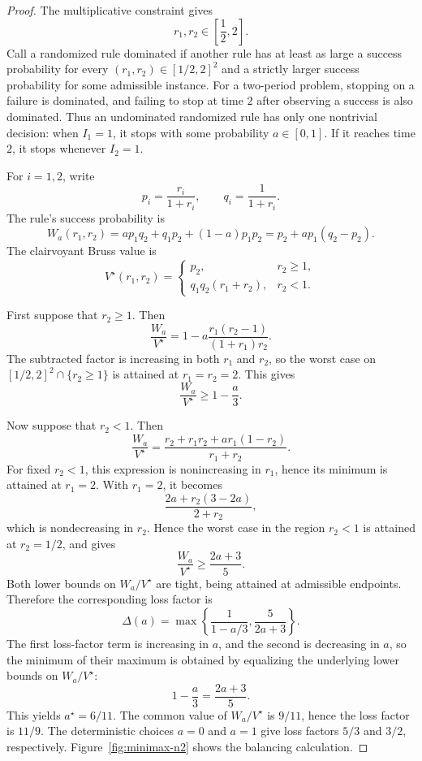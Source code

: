 \documentclass[11pt,a4paper]{article}
\begin{document}
\begin{proof}
The multiplicative constraint gives
\[
  r_1,r_2\in\left[\frac12,2\right].
\]
Call a randomized rule dominated if another rule has at least as large a success
probability for every \((r_1,r_2)\in[1/2,2]^2\) and a strictly larger success
probability for some admissible instance.  For a two-period problem, stopping on
a failure is dominated, and failing to stop at time \(2\) after observing a
success is also dominated.  Thus an undominated randomized rule has only one
nontrivial decision: when \(I_1=1\), it stops with some probability
\(a\in[0,1]\).  If it reaches time \(2\), it stops whenever \(I_2=1\).

For \(i=1,2\), write
\[
  p_i=\frac{r_i}{1+r_i},
  \qquad
  q_i=\frac1{1+r_i}.
\]
The rule's success probability is
\[
  W_a(r_1,r_2)
  = a p_1q_2 + q_1p_2 + (1-a)p_1p_2
  = p_2 + a p_1(q_2-p_2).
\]
The clairvoyant Bruss value is
\[
  V^\star(r_1,r_2)
  =
  \begin{cases}
    p_2, & r_2\ge1,\\[0.3em]
    q_1q_2(r_1+r_2), & r_2<1.
  \end{cases}
\]

First suppose that \(r_2\ge1\).  Then
\[
  \frac{W_a}{V^\star}
  =
  1-a\frac{r_1(r_2-1)}{(1+r_1)r_2}.
\]
The subtracted factor is increasing in both \(r_1\) and \(r_2\), so the worst
case on \([1/2,2]^2\cap\{r_2\ge1\}\) is attained at
\(r_1=r_2=2\).  This gives
\[
  \frac{W_a}{V^\star}
  \ge
  1-\frac a3.
\]

Now suppose that \(r_2<1\).  Then
\[
  \frac{W_a}{V^\star}
  =
  \frac{r_2+r_1r_2+a r_1(1-r_2)}{r_1+r_2}.
\]
For fixed \(r_2<1\), this expression is nonincreasing in \(r_1\), hence its
minimum is attained at \(r_1=2\).  With \(r_1=2\), it becomes
\[
  \frac{2a+r_2(3-2a)}{2+r_2},
\]
which is nondecreasing in \(r_2\).  Hence the worst case in the region
\(r_2<1\) is attained at \(r_2=1/2\), and gives
\[
  \frac{W_a}{V^\star}
  \ge
  \frac{2a+3}{5}.
\]
Both lower bounds on \(W_a/V^\star\) are tight, being attained at admissible
endpoints.  Therefore the corresponding loss factor is
\[
  \Delta(a)
  =
  \max\left\{\frac{1}{1-a/3},\frac{5}{2a+3}\right\}.
\]
The first loss-factor term is increasing in \(a\), and the second is decreasing
in \(a\), so the minimum of their maximum is obtained by equalizing the
underlying lower bounds on \(W_a/V^\star\):
\[
  1-\frac a3=\frac{2a+3}{5}.
\]
This yields \(a^\star=6/11\).  The common value of \(W_a/V^\star\) is \(9/11\),
hence the
loss factor is \(11/9\).  The deterministic choices \(a=0\) and \(a=1\) give
loss factors \(5/3\) and \(3/2\), respectively.  Figure~\ref{fig:minimax-n2}
shows the balancing calculation.
\end{proof}
\end{document}
